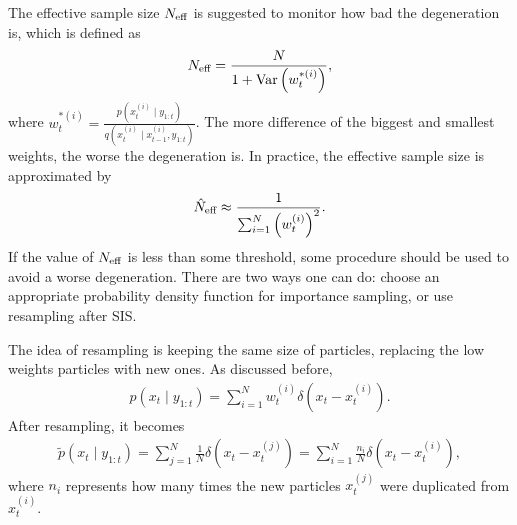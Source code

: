 The effective sample size $N_{\mbox{\scriptsize eff}}$ is suggested to monitor how bad the degeneration is, which is defined as 
\begin{align*}
N_{\mbox{\scriptsize eff}}=\frac{N}{1+\mathrm{Var}\left(w_t^{*(i)}\right)},
\end{align*}
where $w_t^{*(i)}=\frac{p\left(x_t^{(i)}\mid y_{1:t}\right)}{q\left(x_t^{(i)}\mid x_{t-1}^{(i)},y_{1:t}\right)}$. The more difference of the biggest and smallest weights, the worse the degeneration is. In practice, the effective sample size is approximated by
\begin{align*}
\hat{N}_{\mbox{\scriptsize eff}}\approx \frac{1}{\sum_{i=1}^{N}\left(w_t^{(i)}\right)^2}.
\end{align*}
If the value of $N_{\mbox{\scriptsize eff}}$ is less than some threshold, some procedure should be used to avoid a worse degeneration. There are two ways one can do: choose an appropriate probability density function for importance sampling, or use resampling after SIS. 

The idea of resampling is keeping the same size of particles, replacing the low weights particles with new ones. As discussed before, 
\begin{align*}
p(x_t \mid y_{1:t})=\sum_{i=1}^Nw_t^{(i)} \delta \left(x_t -x_t^{(i)}\right).
\end{align*}
After resampling, it becomes
\begin{align*}
\tilde{p}(x_t \mid y_{1:t})=\sum_{j=1}^N\frac{1}{N} \delta \left(x_t -x_t^{(j)}\right)= \sum_{i=1}^N\frac{n_i}{N} \delta \left(x_t -x_t^{(i)}\right),
\end{align*}
where $n_i$ represents how many times the new particles $x_t^{(j)}$ were duplicated from$x_t^{(i)}$. 

